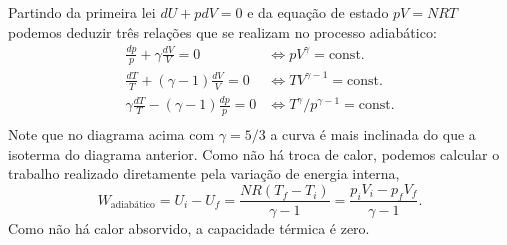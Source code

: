 \documentclass[a4paper, 12pt]{article}
\theoremstyle{definition}
\theoremstyle{definition}
\begin{document}
\noindent Partindo da primeira lei $dU+pdV=0$ e da equação de estado $pV=NRT$ podemos deduzir três
relações que se realizam no processo adiabático:
\begin{align*}
    \frac{dp}{p}+\gamma\frac{dV}{V}=0&\Leftrightarrow pV^\gamma=\text{const.}\\
    \frac{dT}{T}+(\gamma-1)\frac{dV}{V}=0&\Leftrightarrow TV^{\gamma-1}=\text{const.}\\
    \gamma\frac{dT}{T}-(\gamma-1)\frac{dp}{p}=0&\Leftrightarrow T^\gamma/p^{\gamma-1}=\text{const.}\\
\end{align*}
Note que no diagrama acima com $\gamma=5/3$ a curva é mais inclinada do que a isoterma do diagrama anterior.
Como não há troca de calor, podemos calcular o trabalho realizado diretamente pela variação de energia
interna,
$$W_\text{adiabático}=U_i-U_f=\frac{NR(T_f-T_i)}{\gamma-1}=\frac{p_iV_i-p_fV_f}{\gamma-1}.$$
Como não há calor absorvido, a capacidade térmica é zero.
\end{document}
